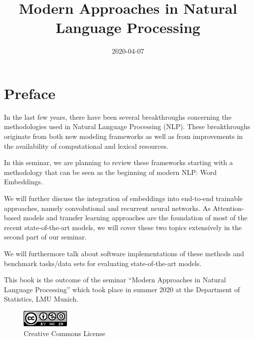 \documentclass[]{krantz}
\title{Modern Approaches in Natural Language Processing}
\author{}
\date{\vspace{-2.5em}2020-04-07}
\begin{document}
\maketitle


\thispagestyle{empty}

\begin{center}
\end{center}

\setlength{\abovedisplayskip}{-5pt}
\setlength{\abovedisplayshortskip}{-5pt}

{
\hypersetup{linkcolor=}
\setcounter{tocdepth}{0}
\tableofcontents
}
\hypertarget{preface}{%
\chapter*{Preface}\label{preface}}


In the last few years, there have been several breakthroughs concerning the methodologies used in Natural Language Processing (NLP). These breakthroughs originate from both new modeling frameworks as well as from improvements in the availability of computational and lexical resources.

In this seminar, we are planning to review these frameworks starting with a methodology that can be seen as the beginning of modern NLP: Word Embeddings.

We will further discuss the integration of embeddings into end-to-end trainable approaches, namely convolutional and recurrent neural networks. As Attention-based models and transfer learning approaches are the foundation of most of the recent state-of-the-art models, we will cover these two topics extensively in the second part of our seminar.

We will furthermore talk about software implementations of these methods and benchmark tasks/data sets for evaluating state-of-the-art models.

This book is the outcome of the seminar ``Modern Approaches in Natural Language Processing'' which took place in summer 2020 at the Department of Statistics, LMU Munich.

\begin{figure}
\centering
\includegraphics{figures/by-nc-sa.png}
\caption{Creative Commons License}
\end{figure}
\end{document}

